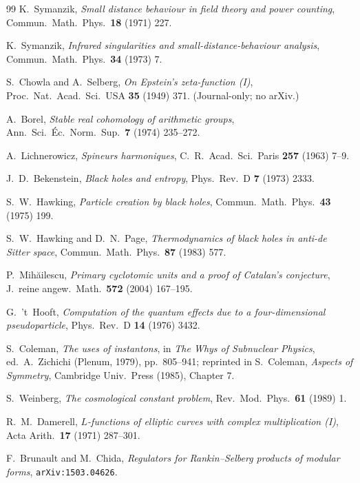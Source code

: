 \documentclass[aps,prl,reprint,superscriptaddress,floatfix,nofootinbib,amssymb]{revtex4-2}
\theoremstyle{definition}
\theoremstyle{remark}
\begin{document}
\begin{thebibliography}{99}
K.~Symanzik,
\emph{Small distance behaviour in field theory and power counting},
Commun.~Math.~Phys.~\textbf{18} (1971) 227.

K.~Symanzik,
\emph{Infrared singularities and small-distance-behaviour analysis},
Commun.~Math.~Phys.~\textbf{34} (1973) 7.

S.~Chowla and A.~Selberg,
\emph{On Epstein's zeta-function (I)}, Proc.~Nat.~Acad.~Sci.~USA
\textbf{35} (1949) 371. (Journal-only; no arXiv.)

A.~Borel,
\emph{Stable real cohomology of arithmetic groups}, Ann.~Sci.~\'Ec.\
Norm.~Sup.~\textbf{7} (1974) 235--272.

A.~Lichnerowicz,
\emph{Spineurs harmoniques}, C.~R.~Acad.~Sci.~Paris \textbf{257}
(1963) 7--9.

J.~D.~Bekenstein,
\emph{Black holes and entropy}, Phys.~Rev.~D \textbf{7} (1973) 2333.

S.~W.~Hawking,
\emph{Particle creation by black holes},
Commun.~Math.~Phys.~\textbf{43} (1975) 199.

S.~W.~Hawking and D.~N.~Page,
\emph{Thermodynamics of black holes in anti-de Sitter space},
Commun.~Math.~Phys.~\textbf{87} (1983) 577.

P.~Mih\u{a}ilescu,
\emph{Primary cyclotomic units and a proof of Catalan's conjecture},
J.~reine angew.~Math.~\textbf{572} (2004) 167--195.

G.~'t~Hooft,
\emph{Computation of the quantum effects due to a four-dimensional
pseudoparticle}, Phys.~Rev.~D \textbf{14} (1976) 3432.

S.~Coleman,
\emph{The uses of instantons}, in \emph{The Whys of Subnuclear
Physics}, ed.~A.~Zichichi (Plenum, 1979), pp.\ 805--941; reprinted
in S.~Coleman, \emph{Aspects of Symmetry}, Cambridge Univ.~Press
(1985), Chapter 7.

S.~Weinberg,
\emph{The cosmological constant problem},
Rev.~Mod.~Phys.~\textbf{61} (1989) 1.

R.~M.~Damerell,
\emph{$L$-functions of elliptic curves with complex multiplication
(I)}, Acta Arith.~\textbf{17} (1971) 287--301.

F.~Brunault and M.~Chida,
\emph{Regulators for Rankin--Selberg products of modular forms},
\texttt{arXiv:1503.04626}.


\end{thebibliography}
\end{document}
